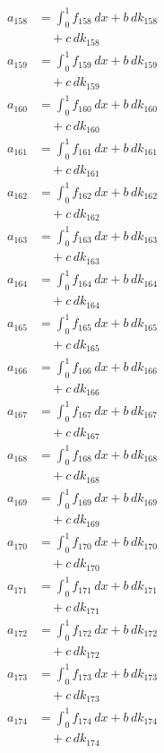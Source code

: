 \documentclass{article}
\begin{document}
\begin{align}
a_{158} &= \int_0^1 f_{158}\,dx + b\,dk_{158} \\
&\quad + c\,dk_{158} \\
a_{159} &= \int_0^1 f_{159}\,dx + b\,dk_{159} \\
&\quad + c\,dk_{159} \\
a_{160} &= \int_0^1 f_{160}\,dx + b\,dk_{160} \\
&\quad + c\,dk_{160} \\
a_{161} &= \int_0^1 f_{161}\,dx + b\,dk_{161} \\
&\quad + c\,dk_{161} \\
a_{162} &= \int_0^1 f_{162}\,dx + b\,dk_{162} \\
&\quad + c\,dk_{162} \\
a_{163} &= \int_0^1 f_{163}\,dx + b\,dk_{163} \\
&\quad + c\,dk_{163} \\
a_{164} &= \int_0^1 f_{164}\,dx + b\,dk_{164} \\
&\quad + c\,dk_{164} \\
a_{165} &= \int_0^1 f_{165}\,dx + b\,dk_{165} \\
&\quad + c\,dk_{165} \\
a_{166} &= \int_0^1 f_{166}\,dx + b\,dk_{166} \\
&\quad + c\,dk_{166} \\
a_{167} &= \int_0^1 f_{167}\,dx + b\,dk_{167} \\
&\quad + c\,dk_{167} \\
a_{168} &= \int_0^1 f_{168}\,dx + b\,dk_{168} \\
&\quad + c\,dk_{168} \\
a_{169} &= \int_0^1 f_{169}\,dx + b\,dk_{169} \\
&\quad + c\,dk_{169} \\
a_{170} &= \int_0^1 f_{170}\,dx + b\,dk_{170} \\
&\quad + c\,dk_{170} \\
a_{171} &= \int_0^1 f_{171}\,dx + b\,dk_{171} \\
&\quad + c\,dk_{171} \\
a_{172} &= \int_0^1 f_{172}\,dx + b\,dk_{172} \\
&\quad + c\,dk_{172} \\
a_{173} &= \int_0^1 f_{173}\,dx + b\,dk_{173} \\
&\quad + c\,dk_{173} \\
a_{174} &= \int_0^1 f_{174}\,dx + b\,dk_{174} \\
&\quad + c\,dk_{174} \\

\end{align}
\end{document}
